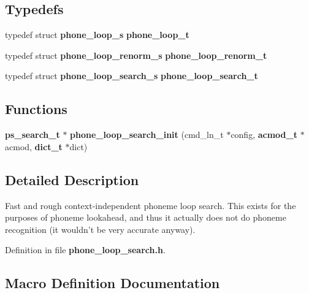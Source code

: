 \subsection*{Typedefs}
\begin{DoxyCompactItemize}
\item 
typedef struct {\bf phone\-\_\-loop\-\_\-s} {\bfseries phone\-\_\-loop\-\_\-t}\label{phone__loop__search_8h_a377517ed7dc87ca9ad683dad2182c036}

\item 
typedef struct {\bf phone\-\_\-loop\-\_\-renorm\-\_\-s} {\bfseries phone\-\_\-loop\-\_\-renorm\-\_\-t}\label{phone__loop__search_8h_a313734607dd312343fd138ccc32b9228}

\item 
typedef struct {\bf phone\-\_\-loop\-\_\-search\-\_\-s} {\bfseries phone\-\_\-loop\-\_\-search\-\_\-t}\label{phone__loop__search_8h_aff0f48051fd9e2725230896875887aa2}

\end{DoxyCompactItemize}
\subsection*{Functions}
\begin{DoxyCompactItemize}
\item 
{\bf ps\-\_\-search\-\_\-t} $\ast$ {\bfseries phone\-\_\-loop\-\_\-search\-\_\-init} (cmd\-\_\-ln\-\_\-t $\ast$config, {\bf acmod\-\_\-t} $\ast$acmod, {\bf dict\-\_\-t} $\ast$dict)\label{phone__loop__search_8h_a2308707c1a22ea9b0495f6c7f151f806}

\end{DoxyCompactItemize}


\subsection{Detailed Description}
Fast and rough context-\/independent phoneme loop search. This exists for the purposes of phoneme lookahead, and thus it actually does not do phoneme recognition (it wouldn't be very accurate anyway). 

Definition in file {\bf phone\-\_\-loop\-\_\-search.\-h}.



\subsection{Macro Definition Documentation}
